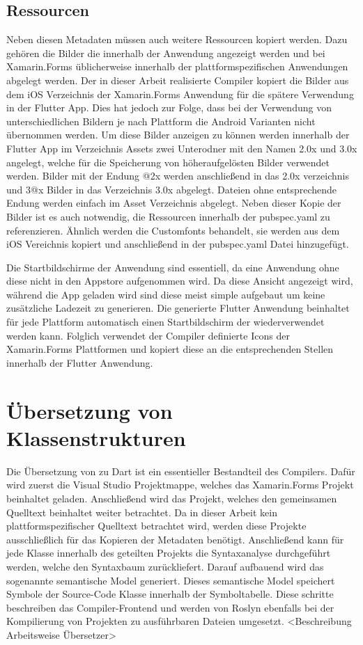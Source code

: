 \subsection{Ressourcen}
Neben diesen Metadaten müssen auch weitere Ressourcen kopiert werden.  Dazu gehören die Bilder die innerhalb der Anwendung angezeigt werden und bei Xamarin.Forms üblicherweise innerhalb der plattformspezifischen Anwendungen abgelegt werden.  Der in dieser Arbeit realisierte Compiler kopiert die Bilder aus dem iOS Verzeichnis der Xamarin.Forms Anwendung für die spätere Verwendung in der Flutter App.  Dies hat jedoch zur Folge, dass bei der Verwendung von unterschiedlichen Bildern je nach Plattform die Android Varianten nicht übernommen werden.  Um diese Bilder anzeigen zu können werden innerhalb der Flutter App im Verzeichnis Assets zwei Unterodner mit den Namen 2.0x und 3.0x angelegt, welche für die Speicherung von höheraufgelösten Bilder verwendet werden.  Bilder mit der Endung @2x werden anschließend in das 2.0x verzeichnis und 3@x Bilder in das Verzeichnis 3.0x abgelegt.  Dateien ohne entsprechende Endung werden einfach im Asset Verzeichnis abgelegt.  Neben dieser Kopie der Bilder ist es auch notwendig,  die Ressourcen innerhalb der pubspec.yaml zu referenzieren. Ähnlich werden die Customfonts behandelt,  sie werden aus dem iOS Vereichnis kopiert und anschließend in der pubspec.yaml Datei hinzugefügt.  


Die Startbildschirme der Anwendung sind essentiell,  da eine Anwendung ohne diese nicht in den Appstore aufgenommen wird.  Da diese Ansicht angezeigt wird,  während die App geladen wird sind diese meist simple aufgebaut um keine zusätzliche Ladezeit zu generieren.  Die generierte Flutter Anwendung beinhaltet für jede Plattform automatisch einen Startbildschirm der wiederverwendet werden kann.  Folglich verwendet der Compiler definierte Icons der Xamarin.Forms Plattformen und kopiert diese an die entsprechenden Stellen innerhalb der Flutter Anwendung.  



\section{Übersetzung von Klassenstrukturen}

Die Übersetzung von \Csharp zu Dart ist ein essentieller Bestandteil des Compilers.  Dafür wird zuerst die Visual Studio Projektmappe,  welches das Xamarin.Forms Projekt beinhaltet geladen.  Anschließend wird das Projekt, welches den gemeinsamen Quelltext beinhaltet weiter betrachtet. Da in dieser Arbeit kein plattformspezifischer Quelltext betrachtet wird,  werden diese Projekte ausschließlich für das Kopieren der Metadaten benötigt.  Anschließend kann für jede Klasse innerhalb des geteilten Projekts die Syntaxanalyse durchgeführt werden, welche den Syntaxbaum zurückliefert.  Darauf aufbauend wird das sogenannte semantische Model generiert.  Dieses semantische Model speichert Symbole der Source-Code Klasse innerhalb der Symboltabelle.  Diese schritte beschreiben das Compiler-Frontend und werden von Roslyn ebenfalls bei der Kompilierung von Projekten zu ausführbaren Dateien umgesetzt.  
<Beschreibung Arbeitsweise Übersetzer>

